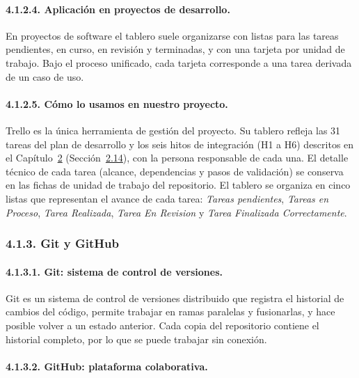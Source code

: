 \paragraph{4.1.2.4. Aplicación en proyectos de desarrollo.}

En proyectos de software el tablero suele organizarse con listas para las tareas pendientes, en curso, en revisión y terminadas, y con una tarjeta por unidad de trabajo. Bajo el proceso unificado, cada tarjeta corresponde a una tarea derivada de un caso de uso.

\paragraph{4.1.2.5. Cómo lo usamos en nuestro proyecto.}

Trello es la única herramienta de gestión del proyecto. Su tablero refleja las 31 tareas del plan de desarrollo y los seis hitos de integración (H1 a H6) descritos en el Capítulo~\hyperref[cap:sqap]{2} (Sección~\hyperref[sec:agenda_sqap]{2.14}), con la persona responsable de cada una. El detalle técnico de cada tarea (alcance, dependencias y pasos de validación) se conserva en las fichas de unidad de trabajo del repositorio. El tablero se organiza en cinco listas que representan el avance de cada tarea: \textit{Tareas pendientes}, \textit{Tareas en Proceso}, \textit{Tarea Realizada}, \textit{Tarea En Revision} y \textit{Tarea Finalizada Correctamente}.

\subsubsection{4.1.3. Git y GitHub}

\paragraph{4.1.3.1. Git: sistema de control de versiones.}

Git es un sistema de control de versiones distribuido que registra el historial de cambios del código, permite trabajar en ramas paralelas y fusionarlas, y hace posible volver a un estado anterior. Cada copia del repositorio contiene el historial completo, por lo que se puede trabajar sin conexión.

\paragraph{4.1.3.2. GitHub: plataforma colaborativa.}

